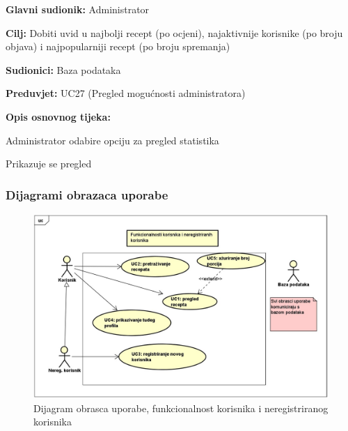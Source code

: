 					\noindent {}
					\begin{packed_item}
						
						\item \textbf{Glavni sudionik: }Administrator
						\item \textbf{Cilj: }Dobiti uvid u najbolji recept (po ocjeni), najaktivnije korisnike (po broju objava) i najpopularniji recept (po broju spremanja)
						\item \textbf{Sudionici: }Baza podataka
						\item \textbf{Preduvjet: }UC27 (Pregled mogućnosti administratora)
						\item \textbf{Opis osnovnog tijeka:}
						
						\item[] \begin{packed_enum}
							\item Administrator odabire opciju za pregled statistika
							\item Prikazuje se pregled
						\end{packed_enum}
					\end{packed_item}
				
					
				\subsubsection{Dijagrami obrazaca uporabe}
					
					\begin{figure}[H]
						\includegraphics[scale=0.4]{slike/UC_nereg.jpeg} %
						\centering
						\caption{Dijagram obrasca uporabe, funkcionalnost korisnika i neregistriranog korisnika}
						\label{fig:UC_diagram1}
					\end{figure}


